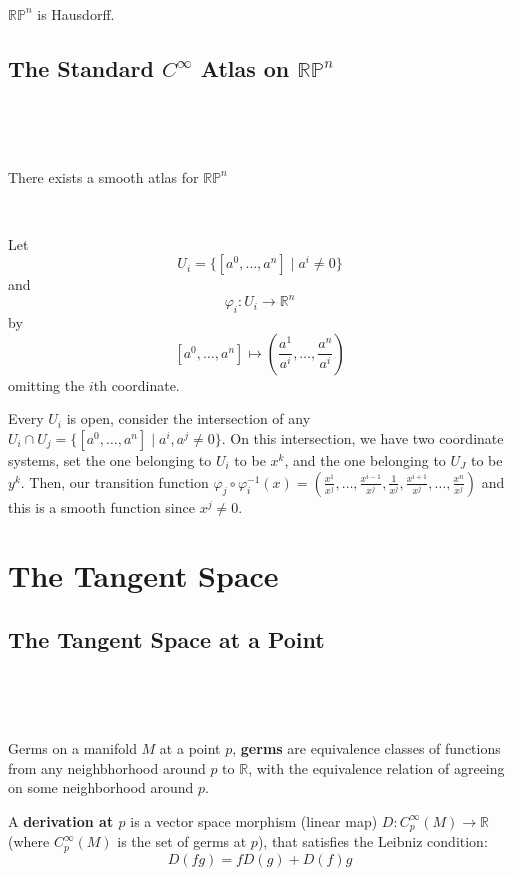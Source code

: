 \documentclass{article}
\begin{document}
\begin{proposition}
  \

  $\mathbb{RP}^n$ is Hausdorff.
\end{proposition}

\subsection{The Standard $C^\infty$ Atlas on $\mathbb{RP}^n$}
\

\begin{theorem}
  \

  There exists a smooth atlas for $\mathbb{RP}^n$
\end{theorem}

\begin{customproof}
  \

  Let $$U_i = \{[a^0, \dots, a^n] \mid a^i \neq 0\}$$and $$\varphi_i: U_i \to \mathbb{R}^n$$ by $$[a^0, \dots, a^n] \mapsto (\frac{a^1}{a^i}, \dots, \frac{a^n}{a^i})$$omitting the $i$th coordinate.

  Every $U_i$ is open, consider the intersection of any $U_i \cap U_j = \{[a^0, \dots, a^n] \mid a^i, a^j \neq 0\}$. On this intersection, we have two coordinate systems, set the one belonging to $U_i$ to be $x^k$, and the one belonging to $U_J$ to be $y^k$. Then, our transition function $\varphi_j \circ \varphi_i ^{-1}(x) = (\frac{x^1}{x^j}, \dots, \frac{x^{i-1}}{x^j}, \frac{1}{x^j}, \frac{x^{i+1}}{x^j}, \dots, \frac{x^n}{x^j})$ and this is a smooth function since $x^j \neq 0$.
\end{customproof}

\section{The Tangent Space}

\subsection{The Tangent Space at a Point}
\

\begin{definition}
  \

  Germs on a manifold $M$ at a point $p$, \textbf{germs} are equivalence classes of functions from any neighbhorhood around $p$ to $\mathbb{R}$, with the equivalence relation of agreeing on some neighborhood around $p$.

  A \textbf{derivation at $p$} is a vector space morphism (linear map) $D: C^\infty_p(M) \to \mathbb{R}$ (where $C^\infty_p(M)$ is the set of germs at $p$), that satisfies the Leibniz condition: $$D(fg) = fD(g) + D(f)g$$
\end{definition}
\end{document}
